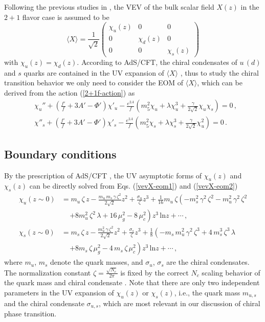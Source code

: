 \documentclass[11pt,a4paper,psfrag]{article}
\begin{document}
Following the previous studies in \cite{Chelabi:2015cwn,Chelabi:2015gpc}, the VEV of the bulk scalar field $X(z)$ in the $2+1$ flavor case is assumed to be
\begin{equation}
\label{VEVs}
\langle X \rangle=\frac{1}{\sqrt{2}}
\begin{pmatrix}
\chi_u(z) & 0 & 0\\
0 & \chi_d(z) & 0 \\
0 & 0 & \chi_s(z)
\end{pmatrix}
\end{equation}
with $\chi_u(z) = \chi_d(z)$. According to AdS/CFT, the chiral condensates of $u\,(d)$ and $s$ quarks are contained in the UV expansion of $\langle X\rangle$ \cite{DaRold2005,Erlich:2005qh}, thus to study the chiral transition behavior we only need to consider the EOM of $\langle X\rangle$, which can be derived from the action (\ref{2+1f-action}) as
\begin{align}
& \chi_{u}'' +\left(\frac{f'}{f}+3A'-\Phi'\right)\chi'_{u} -\frac{e^{2A}}{f}\left(m_5^2\chi_u +\lambda\chi_u^3 +\frac{\gamma}{2\sqrt{2}}\chi_u\chi_s \right) =0 \,, \label{vevX-eom1} \\
& \chi''_{s} +\left(\frac{f'}{f}+3A'-\Phi'\right)\chi'_{s} -\frac{e^{2A}}{f}\left(m_5^2\chi_s +\lambda\chi_s^3 +\frac{\gamma}{2\sqrt{2}}\chi_{u}^{2}\right) =0 \,.  \label{vevX-eom2}
\end{align}


\subsection{Boundary conditions}\label{bc-EOM}

By the prescription of AdS/CFT \cite{DaRold2005,Erlich:2005qh}, the UV asymptotic forms of $\chi_u(z)$ and $\chi_s(z)$ can be directly solved from Eqs. (\ref{vevX-eom1}) and (\ref{vevX-eom2})
\begin{align}
\chi_u(z \sim 0) &=m_u\,\zeta\,z-\frac{m_u\, m_s\,\gamma \, \zeta^2}{2\sqrt2}z^2+\frac{\sigma_u}{\zeta}z^3+\frac{1}{16}m_u\,\zeta\left(-m_s^2 \, \gamma^2\,\zeta^2-m_u^2\, \gamma^2 \,\zeta^2 \right.\nonumber\\
&\,\quad \left. +8 m_u^2 \,\zeta^2 \,\lambda+16 \,\mu_g^2-8 \,\mu_c^2\right)z^3 \,\mathrm{ln}z +\cdots \,, \label{asyExpOfChius1}  \\
\chi_s(z \sim 0) &=m_s\,\zeta\,z-\frac{m_u^2\,\gamma \, \zeta^2}{2\sqrt2}z^2+\frac{\sigma_s}{\zeta}z^3+\frac{1}{8}\left(-m_s\,m_u^2 \, \gamma^2\,\zeta^3+4\,m_s^3\,\zeta^3\,\lambda \right. \nonumber \\
&\,\quad \left. +8 m_s \,\zeta \,\mu_g^2-4 \,m_s\,\zeta\,\mu_c^2 \right)z^3 \,\mathrm{ln}z +\cdots \,, \label{asyExpOfChius2}
\end{align}
where $m_u$, $m_{s}$ denote the quark masses, and $\sigma_u$, $\sigma_s$ are the chiral condensates. The normalization constant $\zeta=\frac{\sqrt{N_c}}{2\pi}$ is fixed by the correct $N_c$ scaling behavior of the quark mass and chiral condensate \cite{Cherman:2008eh}. Note that there are only two independent parameters in the UV expansion of $\chi_u(z)$ or $\chi_s(z)$, i.e., the quark mass $m_{u,s}$ and the chiral condensate $\sigma_{u,s}$, which are most relevant in our discussion of chiral phase transition.
\end{document}
